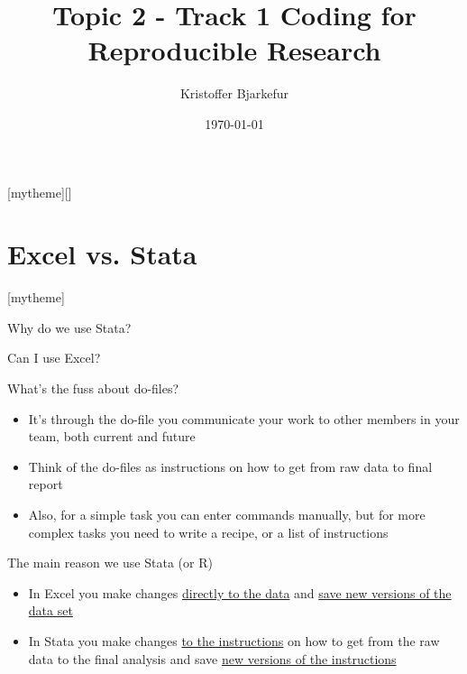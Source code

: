 \documentclass[aspectratio=169]{beamer}
\title{Topic 2 - Track 1 \newline Coding for Reproducible Research}
\date{\today}
\author{Kristoffer Bjarkefur} %
\institute{Development Impact Evaluation (DIME) \newline The World Bank }
\newcommand{\sectionpic}[2]{
	\setbeamertemplate{section page}[mytheme][#2]
	\section{#1}
	\setbeamertemplate{section page}[mytheme]
}
\begin{document}
	
{
	\maketitle
}

\sectionpic{Excel vs. Stata}{}


\begin{frame}{Why do we use Stata?}
\begin{center}
	\huge Can I use Excel? 
\end{center}

\end{frame}


\begin{frame}{What's the fuss about do-files?}

\begin{itemize}
	\item It’s through the do-file you communicate your work to other members in your team, both current and future

	\item Think of the do-files as instructions on how to get from raw data to final report

	\item Also, for a simple task you can enter commands manually, but for more complex tasks you need to write a recipe, or a list of instructions

\end{itemize}
\end{frame}

\begin{frame}{The main reason we use Stata (or R)}
\begin{itemize}
	
	\item In Excel you make changes \underline{directly to the data} and \underline{save new versions of the data set}

	\item In Stata you make changes \underline{to the instructions} on how to get from the raw data to the final analysis and save \underline{new versions of the instructions}
\end{itemize}
\end{frame}
\end{document}
